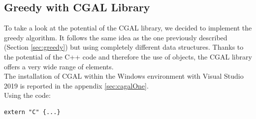 \subsection{Greedy with CGAL Library}
To take a look at the potential of the CGAL library, we decided to implement the greedy algorithm. It follows the same idea as the one previously described (Section \ref{sec:greedy}) but using completely different data structures. Thanks to the potential of the C++ code and therefore the use of objects, the CGAL library offers a very wide range of elements.\\ 
The installation of CGAL within the Windows environment with Visual Studio 2019 is reported in the appendix \ref{sec:cagalOne}.\\
Using the code:

\begin{lstlisting}
extern "C" {...}
\end{lstlisting}

